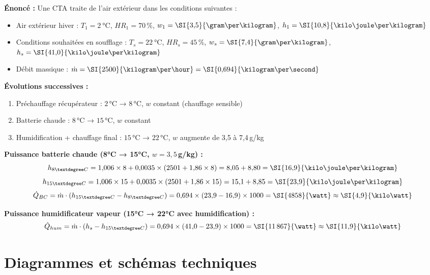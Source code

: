 \begin{exemple}[title=Évolution de l'air dans une CTA hiver — diagramme de Mollier]
\textbf{Énoncé :} Une CTA traite de l'air extérieur dans les conditions suivantes :
\begin{itemize}
  \item Air extérieur hiver : $T_1 = \SI{2}{\celsius}$, $HR_1 = 70\,\%$, $w_1 = \SI{3{,}5}{\gram\per\kilogram}$, $h_1 = \SI{10{,}8}{\kilo\joule\per\kilogram}$
  \item Conditions souhaitées en soufflage : $T_s = \SI{22}{\celsius}$, $HR_s = 45\,\%$, $w_s = \SI{7{,}4}{\gram\per\kilogram}$, $h_s = \SI{41{,}0}{\kilo\joule\per\kilogram}$
  \item Débit massique : $\dot{m} = \SI{2500}{\kilogram\per\hour} = \SI{0{,}694}{\kilogram\per\second}$
\end{itemize}

\textbf{Évolutions successives :}
\begin{enumerate}
  \item Préchauffage récupérateur : $2$\,°C → $8$\,°C, $w$ constant (chauffage sensible)
  \item Batterie chaude : $8$\,°C → $15$\,°C, $w$ constant
  \item Humidification + chauffage final : $15$\,°C → $22$\,°C, $w$ augmente de 3,5 à 7,4\,g/kg
\end{enumerate}

\textbf{Puissance batterie chaude (8°C → 15°C, $w = 3{,}5$\,g/kg) :}
\[
  h_{8°C} = 1{,}006 \times 8 + 0{,}0035 \times (2501 + 1{,}86 \times 8) = 8{,}05 + 8{,}80 = \SI{16{,}9}{\kilo\joule\per\kilogram}
\]
\[
  h_{15°C} = 1{,}006 \times 15 + 0{,}0035 \times (2501 + 1{,}86 \times 15) = 15{,}1 + 8{,}85 = \SI{23{,}9}{\kilo\joule\per\kilogram}
\]
\[
  \dot{Q}_{BC} = \dot{m} \cdot (h_{15°C} - h_{8°C}) = 0{,}694 \times (23{,}9 - 16{,}9) \times 1000 = \SI{4858}{\watt} \approx \SI{4{,}9}{\kilo\watt}
\]

\textbf{Puissance humidificateur vapeur (15°C → 22°C avec humidification) :}
\[
  \dot{Q}_{hum} = \dot{m} \cdot (h_s - h_{15°C}) = 0{,}694 \times (41{,}0 - 23{,}9) \times 1000 = \SI{11\,867}{\watt} \approx \SI{11{,}9}{\kilo\watt}
\]
\end{exemple}

\section{Diagrammes et schémas techniques}

